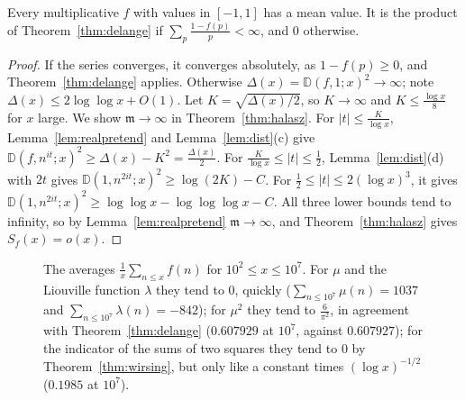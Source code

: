 \begin{theorem}[Wirsing, 1967]\label{thm:wirsing}
Every multiplicative $f$ with values in $[-1,1]$ has a mean value. It is the product of Theorem~\ref{thm:delange} if $\sum_p\frac{1-f(p)}p<\infty$, and $0$ otherwise.
\end{theorem}
\begin{proof}
If the series converges, it converges absolutely, as $1-f(p)\ge0$, and Theorem~\ref{thm:delange} applies. Otherwise $\Delta(x)=\mathbb D(f,1;x)^2\to\infty$; note $\Delta(x)\le2\log\log x+O(1)$. Let $K=\sqrt{\Delta(x)/2}$, so $K\to\infty$ and $K\le\frac{\log x}8$ for $x$ large. We show $\mathfrak m\to\infty$ in Theorem~\ref{thm:halasz}. For $|t|\le\frac K{\log x}$, Lemma~\ref{lem:realpretend} and Lemma~\ref{lem:dist}(c) give $\mathbb D(f,n^{it};x)^2\ge\Delta(x)-K^2=\frac{\Delta(x)}2$. For $\frac K{\log x}\le|t|\le\frac12$, Lemma~\ref{lem:dist}(d) with $2t$ gives $\mathbb D(1,n^{2it};x)^2\ge\log(2K)-C$. For $\frac12\le|t|\le2(\log x)^3$, it gives $\mathbb D(1,n^{2it};x)^2\ge\log\log x-\log\log\log x-C$. All three lower bounds tend to infinity, so by Lemma~\ref{lem:realpretend} $\mathfrak m\to\infty$, and Theorem~\ref{thm:halasz} gives $S_f(x)=o(x)$.
\end{proof}

\begin{figure}[ht]
\centering
{}
\caption{The averages $\frac1x\sum_{n\le x}f(n)$ for $10^2\le x\le10^7$. For $\mu$ and the Liouville function $\lambda$ they tend to $0$, quickly ($\sum_{n\le10^7}\mu(n)=1037$ and $\sum_{n\le10^7}\lambda(n)=-842$); for $\mu^2$ they tend to $\frac6{\pi^2}$, in agreement with Theorem~\ref{thm:delange} ($0.607929$ at $10^7$, against $0.607927$); for the indicator of the sums of two squares they tend to $0$ by Theorem~\ref{thm:wirsing}, but only like a constant times $(\log x)^{-1/2}$ ($0.1985$ at $10^7$).}
\label{fig:means}
\end{figure}

